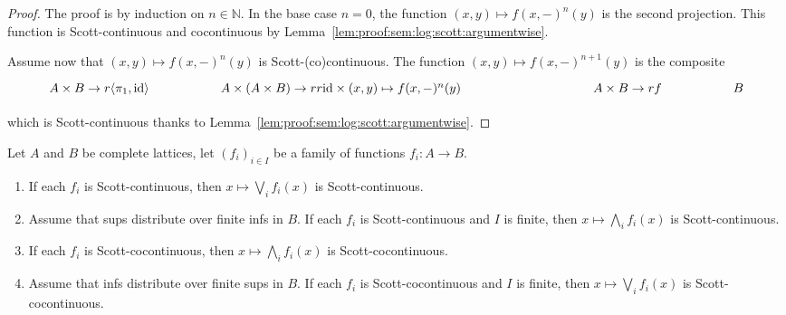 \documentclass[%
  a4paper,
  UKenglish,
  cleveref,
  autoref,
  thm-restate,
  numberwithinsect,
]{lipics-v2021}
\newcommand\pair[1]{{\langle #1\rangle}}
\newcommand\NN{\mathbb{N}}
\newcommand\id{\mathrm{id}}
\newcommand\arrow\to
\begin{document}
\begin{proof}
The proof is by induction on $n \in \NN$.
In the base case $n=0$,
the function $(x,y) \mapsto f(x,-)^n(y)$ is the second projection.
This function is Scott-continuous and cocontinuous by
Lemma~\ref{lem:proof:sem:log:scott:argumentwise}.

Assume now that $(x,y) \mapsto f(x,-)^n(y)$ is Scott-(co)continuous.
The function 
$(x,y) \mapsto f(x,-)^{n+1}(y)$ is the composite
\[
\begin{tikzcd}[column sep=huge]
  A \times B
  \arrow{r}{\pair{\pi_1,\id}}
& A \times (A \times B)
  \arrow{rr}{\id \times (x,y) \mapsto f(x,-)^n(y)}
&
& A \times B
  \arrow{r}{f}
& B
\end{tikzcd}
\]

\noindent
which is Scott-continuous thanks to Lemma~\ref{lem:proof:sem:log:scott:argumentwise}.
\end{proof}

\begin{lemma}
\label{lem:proof:sem:log:scott:veewedge}
Let $A$ and $B$ be complete lattices,
let ${(f_i)}_{i \in I}$ be a family of functions $f_i \colon A \to B$.
\begin{enumerate}[(1)]
\item
\label{item:proof:sem:log:scott:veewedge:contvee}
If each $f_i$ is Scott-continuous,
then
$x \mapsto \bigvee_i f_i(x)$
is Scott-continuous.

\item
\label{item:proof:sem:log:scott:veewedge:contwedge}
Assume that sups distribute over finite infs in $B$.
If each $f_i$ is Scott-continuous and $I$ is finite,
then
$x \mapsto \bigwedge_i f_i(x)$
is Scott-continuous.

\item
\label{item:proof:sem:log:scott:veewedge:cocontwedge}
If each $f_i$ is Scott-cocontinuous,
then
$x \mapsto \bigwedge_i f_i(x)$
is Scott-cocontinuous.

\item
\label{item:proof:sem:log:scott:veewedge:cocontvee}
Assume that infs distribute over finite sups in $B$.
If each $f_i$ is Scott-cocontinuous and $I$ is finite,
then
$x \mapsto \bigvee_i f_i(x)$
is Scott-cocontinuous.
\end{enumerate}
\end{lemma}
\end{document}
